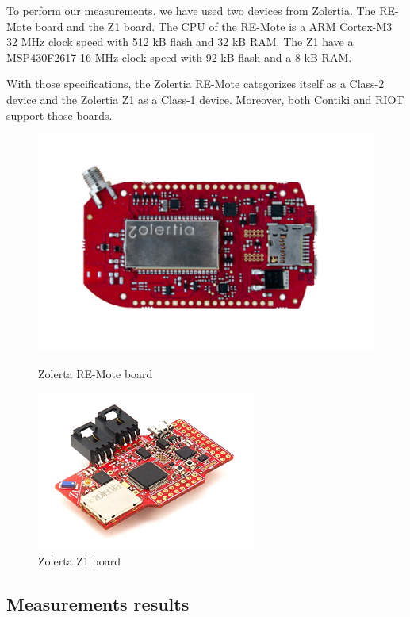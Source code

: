 To perform our measurements, we have used two devices from Zolertia.
The RE-Mote board\cite{zolertia-remote} and the Z1 board\cite{zolertia-z1}.
The CPU of the RE-Mote is a ARM Cortex-M3\cite{arm-cortex-m3} 32 MHz clock speed with 512 kB flash and 32 kB RAM.
The Z1 have a MSP430F2617\cite{msp430} 16 MHz clock speed with 92 kB flash and a 8 kB RAM.

With those specifications, the Zolertia RE-Mote categorizes itself as a Class-2 device and the Zolertia Z1 as a Class-1 device.
Moreover, both Contiki and RIOT support those boards.

\begin{figure}[!ht]
    \begin{minipage}{.45\textwidth}
        \centering
        \includegraphics[scale=.5]{assets/remote.png}
        \caption{Zolerta RE-Mote board}
    \end{minipage}\hfill
    \begin{minipage}{.45\textwidth}        
        \centering
        \includegraphics[scale=2.5]{assets/z1.png}
        \caption{Zolerta Z1 board}
    \end{minipage}
\end{figure}

\subsection{Measurements results\label{sec:ref-measurements}}

